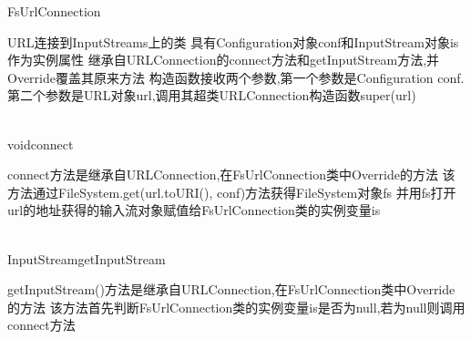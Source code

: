 \begin{XeClass}{FsUrlConnection}
   
 URL连接到InputStreams上的类
 具有Configuration对象conf和InputStream对象is作为实例属性
 继承自URLConnection的connect方法和getInputStream方法,并Override覆盖其原来方法
 构造函数接收两个参数,第一个参数是Configuration conf.
 第二个参数是URL对象url,调用其超类URLConnection构造函数super(url)

  \begin{XeMethod}{\XePublic\\ }{void}{connect}
       
 connect方法是继承自URLConnection,在FsUrlConnection类中Override的方法
 该方法通过FileSystem.get(url.toURI(), conf)方法获得FileSystem对象fs
 并用fs打开url的地址获得的输入流对象赋值给FsUrlConnection类的实例变量is

  \end{XeMethod}

  \begin{XeMethod}{\XePublic\\ }{InputStream}{getInputStream}
       
 getInputStream()方法是继承自URLConnection,在FsUrlConnection类中Override的方法
 该方法首先判断FsUrlConnection类的实例变量is是否为null,若为null则调用connect方法

  \end{XeMethod}

\end{XeClass}
